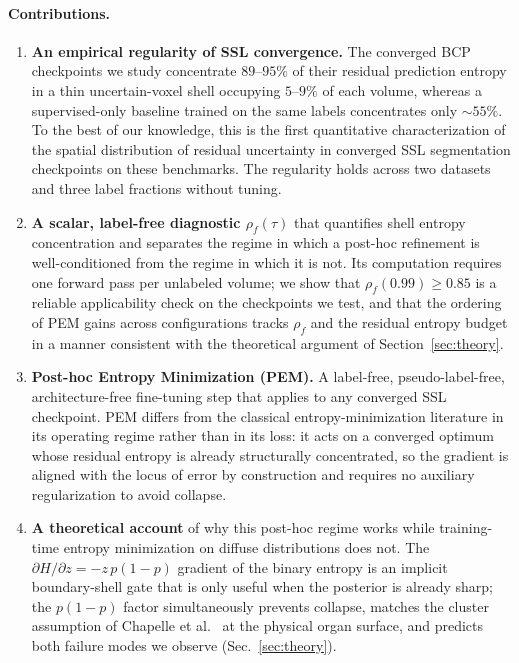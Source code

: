 \paragraph{Contributions.}
\begin{enumerate}
    \setlength\itemsep{1pt}
    \item \textbf{An empirical regularity of SSL convergence.} The converged BCP checkpoints we study concentrate $89$--$95\%$ of their residual prediction entropy in a thin uncertain-voxel shell occupying $5$--$9\%$ of each volume, whereas a supervised-only baseline trained on the same labels concentrates only $\sim\!55\%$. To the best of our knowledge, this is the first quantitative characterization of the spatial distribution of residual uncertainty in converged SSL segmentation checkpoints on these benchmarks. The regularity holds across two datasets and three label fractions without tuning.
    \item \textbf{A scalar, label-free diagnostic $\rho_f(\tau)$} that quantifies shell entropy concentration and separates the regime in which a post-hoc refinement is well-conditioned from the regime in which it is not. Its computation requires one forward pass per unlabeled volume; we show that $\rho_f(0.99)\!\ge\!0.85$ is a reliable applicability check on the checkpoints we test, and that the ordering of PEM gains across configurations tracks $\rho_f$ and the residual entropy budget in a manner consistent with the theoretical argument of Section~\ref{sec:theory}.
    \item \textbf{Post-hoc Entropy Minimization (PEM).} A label-free, pseudo-label-free, architecture-free fine-tuning step that applies to any converged SSL checkpoint. PEM differs from the classical entropy-minimization literature in its operating regime rather than in its loss: it acts on a converged optimum whose residual entropy is already structurally concentrated, so the gradient is aligned with the locus of error by construction and requires no auxiliary regularization to avoid collapse.
    \item \textbf{A theoretical account} of why this post-hoc regime works while training-time entropy minimization on diffuse distributions does not. The $\partial H/\partial z = -z\,p(1{-}p)$ gradient of the binary entropy is an implicit boundary-shell gate that is only useful when the posterior is already sharp; the $p(1{-}p)$ factor simultaneously prevents collapse, matches the cluster assumption of Chapelle et al.~\cite{chapelle2006ssl} at the physical organ surface, and predicts both failure modes we observe (Sec.~\ref{sec:theory}).

\end{enumerate}
